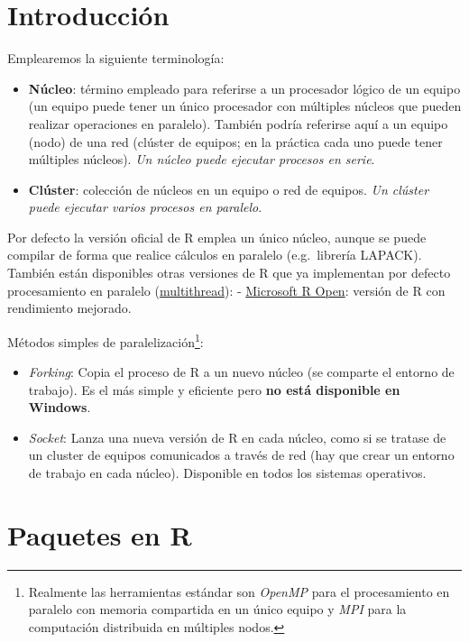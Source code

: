 \documentclass[
]{book}
\theoremstyle{break}
\theoremstyle{nonumberplain}
\begin{document}
\hypertarget{introducciuxf3n}{%
\section{Introducción}\label{introducciuxf3n}}

Emplearemos la siguiente terminología:

\begin{itemize}
\item
  \textbf{Núcleo}: término empleado para referirse a un procesador lógico de un equipo (un equipo puede tener un único procesador con múltiples núcleos que pueden realizar operaciones en paralelo).
  También podría referirse aquí a un equipo (nodo) de una red (clúster de equipos; en la práctica cada uno puede tener múltiples núcleos). \emph{Un núcleo puede ejecutar procesos en serie}.
\item
  \textbf{Clúster}: colección de núcleos en un equipo o red de equipos.
  \emph{Un clúster puede ejecutar varios procesos en paralelo}.
\end{itemize}

Por defecto la versión oficial de R emplea un único núcleo, aunque se puede compilar de forma que realice cálculos en paralelo (e.g.~librería LAPACK).
También están disponibles otras versiones de R que ya implementan por defecto procesamiento en paralelo (\href{https://mran.revolutionanalytics.com/documents/rro/multithread}{multithread}):
- \href{https://mran.revolutionanalytics.com}{Microsoft R Open}: versión de R con rendimiento mejorado.

Métodos simples de paralelización\footnote{Realmente las herramientas estándar son \emph{OpenMP} para el procesamiento en paralelo con memoria compartida en un único equipo y \emph{MPI} para la computación distribuida en múltiples nodos.}:

\begin{itemize}
\item
  \emph{Forking}: Copia el proceso de R a un nuevo núcleo (se comparte el entorno de trabajo).
  Es el más simple y eficiente pero \textbf{no está disponible en Windows}.
\item
  \emph{Socket}: Lanza una nueva versión de R en cada núcleo, como si se tratase de un cluster de equipos comunicados a través de red (hay que crear un entorno de trabajo en cada núcleo).
  Disponible en todos los sistemas operativos.
\end{itemize}

\hypertarget{paquetes-en-r}{%
\section{Paquetes en R}\label{paquetes-en-r}}
\end{document}
